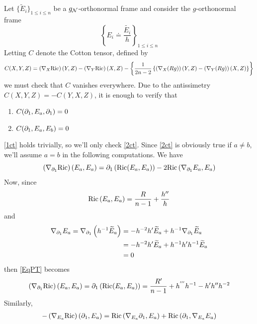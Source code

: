         \begin{demm}
            Let $\{ \widetilde{E}_i \}_{1 \leq i \leq n}$ be a $g_{\mathcal{N}}$-orthonormal frame and consider the $g$-orthonormal frame $$\left\{ E_i \doteq \frac{\widetilde{E_i}}{h}\right\}_{1 \leq i \leq n}$$ Letting $C$ denote the Cotton tensor, defined by 
            \[
                C(X, Y, Z) = \left(\nabla_X \mathrm{Ric}\right)(Y, Z) -  \left(\nabla_Y \mathrm{Ric}\right)(X, Z) - \left\{ \frac{1}{2n-2} \left\{\left(\nabla_X (Rg)\right)(Y, Z) - \left(\nabla_Y (Rg)\right)(X, Z)\right\} \right\}
                \]
            we must check that $C$ vanishes everywhere. Due to the antissimetry $C(X, Y, Z) = -C(Y, X, Z)$, it is enough to verify that
            \begin{enumerate}[label=\textbf{(\roman*)}]
                \item\label{1ct} $C(\partial_1, E_a, \partial_1) = 0 $
                \item\label{2ct} $C(\partial_1, E_a, E_b) = 0$
            \end{enumerate}
                 \cref{1ct} holds trivially, so we'll only check \cref{2ct}. Since \cref{2ct} is obviously true if $a \neq b$, we'll assume $a = b$ in the following computations. We have
            \begin{equation}\label{EqPT}
                \left(\nabla_{\partial_1} \mathrm{Ric} \right)(E_a, E_a) = \partial_1\left(\mathrm{Ric}(E_a, E_a)\right) - 2 \mathrm{Ric}\left(\nabla_{\partial_1} E_a, E_a\right)
            \end{equation}
            Now, since
            \[ \mathrm{Ric}\left(E_a, E_a\right) = \frac{R}{n-1} + \frac{h''}{h}\]
            and
            \begin{align*}
                \nabla_{\partial_1} E_a = \nabla_{\partial_1} \left(h^{-1} \widetilde{E}_a\right) &= -h^{-2}h'  \widetilde{E}_a + h^{-1} \nabla_{\partial_1} \widetilde{E}_a \\
                &= -h^{-2}h'  \widetilde{E}_a + h^{-1} h' h^{-1}  \widetilde{E}_a \\
                &= 0
            \end{align*}
            then \cref{EqPT} becomes
            \begin{equation}\label{eqPTT}
                \left(\nabla_{\partial_1} \mathrm{Ric} \right)(E_a, E_a) = \partial_1\left(\mathrm{Ric}(E_a, E_a)\right) = \frac{R'}{n-1} + h^{'''}h^{-1} - h' h'' h^{-2}
            \end{equation}
            Similarly, 
            \begin{equation}\label{eqST}
                \begin{aligned}
                    - \pa{\nabla_{E_a} \Ric }(\pp, E_a) &= \Ric\pa{\na_{E_a} \pp, E_a} + \ric{\pp, \na_{E_a} E_a} \\

\end{aligned}
\end{equation}
\end{demm}
